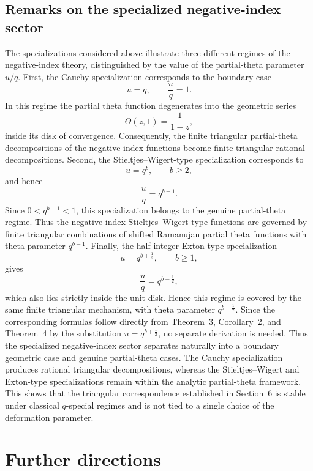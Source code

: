 \documentclass[12pt]{article}
\begin{document}
\subsection{Remarks on the specialized negative-index sector}

The specializations considered above illustrate three different regimes of the negative-index theory, distinguished by the value of the partial-theta parameter \(u/q\). First, the Cauchy specialization corresponds to the boundary case \[ u=q, \qquad \frac{u}{q}=1. \] In this regime the partial theta function degenerates into the geometric series \[ \Theta(z,1)=\frac{1}{1-z}, \] inside its disk of convergence. Consequently, the finite triangular partial-theta decompositions of the negative-index functions become finite triangular rational decompositions. Second, the Stieltjes--Wigert-type specialization corresponds to \[ u=q^b,\qquad b\geq2, \] and hence \[ \frac{u}{q}=q^{b-1}. \] Since \(0<q^{b-1}<1\), this specialization belongs to the genuine partial-theta regime. Thus the negative-index Stieltjes--Wigert-type functions are governed by finite triangular combinations of shifted Ramanujan partial theta functions with theta parameter \(q^{b-1}\). Finally, the half-integer Exton-type specialization \[ u=q^{b+\frac12},\qquad b\geq1, \] gives \[ \frac{u}{q}=q^{b-\frac12}, \] which also lies strictly inside the unit disk. Hence this regime is covered by the same finite triangular mechanism, with theta parameter \(q^{b-\frac12}\). Since the corresponding formulas follow directly from Theorem~3, Corollary~2, and Theorem~4 by the substitution \(u=q^{b+\frac12}\), no separate derivation is needed. Thus the specialized negative-index sector separates naturally into a boundary geometric case and genuine partial-theta cases. The Cauchy specialization produces rational triangular decompositions, whereas the Stieltjes--Wigert and Exton-type specializations remain within the analytic partial-theta framework. This shows that the triangular correspondence established in Section~6 is stable under classical \(q\)-special regimes and is not tied to a single choice of the deformation parameter.


\section{Further directions} 
\end{document}
